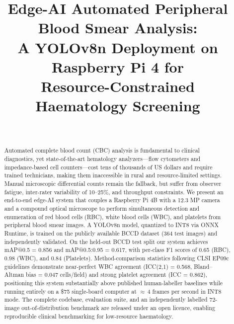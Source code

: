 \documentclass[10pt,conference]{IEEEtran}
\newcommand{\mAPBCCD}{0.856}
\newcommand{\mAPfullBCCD}{0.617}
\begin{document}
\title{%
  Edge-AI Automated Peripheral Blood Smear Analysis:\\
  A YOLOv8n Deployment on Raspberry Pi 4 for\\
  Resource-Constrained Haematology Screening%
}

\author{%
  \\
}

\maketitle

\begin{abstract}
Automated complete blood count (CBC) analysis is fundamental to clinical diagnostics, yet state-of-the-art hematology analyzers—flow cytometers and impedance-based cell counters—cost tens of thousands of US dollars and require trained technicians, making them inaccessible in rural and resource-limited settings. Manual microscopic differential counts remain the fallback, but suffer from observer fatigue, inter-rater variability of 10–25\%, and throughput constraints. We present an end-to-end edge-AI system that couples a Raspberry Pi 4B with a 12.3 MP camera and a compound optical microscope to perform simultaneous detection and enumeration of red blood cells (RBC), white blood cells (WBC), and platelets from peripheral blood smear images. A YOLOv8n model, quantized to INT8 via ONNX Runtime, is trained on the publicly available BCCD dataset (364 test images) and independently validated. On the held-out BCCD test split our system achieves mAP@0.5 = \mAPBCCD{} and mAP@0.5:0.95 = \mAPfullBCCD{}, with per-class F1 scores of 0.65 (RBC), 0.98 (WBC), and 0.84 (Platelets). Method-comparison statistics following CLSI EP09c guidelines demonstrate near-perfect WBC agreement (ICC(2,1) = 0.568, Bland–Altman bias = 0.047 cells/field) and strong platelet agreement (ICC = 0.862), positioning this system substantially above published human-labeller baselines while running entirely on a \$75 single-board computer at $\approx$\,4 frames per second in INT8 mode. The complete codebase, evaluation suite, and an independently labelled 72-image out-of-distribution benchmark are released under an open licence, enabling reproducible clinical benchmarking for low-resource haematology.
\end{abstract}
\end{document}
